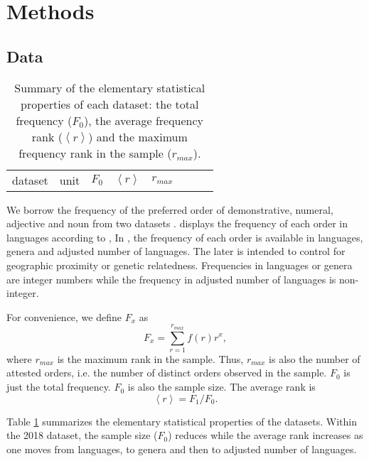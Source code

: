 \documentclass[USenglish]{article}
\begin{document}
\section{Methods}

\subsection{Data}

\label{subsec:data}

\begin{table}[h]
\begin{center}
\begin{tabular}{llllllll}
dataset & unit & $F_0$ & $\left< r \right>$ & $r_{max}$ \\

\end{tabular}
\end{center}
\caption{\label{tbl:elementary_summary}
Summary of the elementary statistical properties of each dataset: the total frequency ($F_0$), the average frequency rank ($\left< r \right>$) and the maximum frequency rank in the sample ($r_{max}$). }
\end{table}

We borrow the frequency of the preferred order of demonstrative, numeral, adjective and noun from two datasets \citep{Dryer2006a, Dryer2018a}. 
\citet[Appendix]{Cysouw2010a} displays the frequency of each order in languages according to \citet{Dryer2006a},
In \citet{Dryer2018a}, the frequency of each order is available in languages, genera and adjusted number of languages. The later is intended to control for geographic proximity or genetic relatedness.  
Frequencies in languages or genera are integer numbers while the frequency in adjusted number of languages is non-integer.
 
For convenience, we define $F_x$ as  
\begin{equation*}
F_x = \sum_{r=1}^{r_{max}}f(r)r^x,
\end{equation*}
where $r_{max}$ is the maximum rank in the sample. Thus, $r_{max}$ is also the number of attested orders, i.e. the number of distinct orders observed in the sample.
$F_0$ is just the total frequency. $F_0$ is also the sample size. 
The average rank is 
\begin{equation*}
\left< r \right> = F_1/F_0.
\end{equation*}

Table \ref{tbl:elementary_summary} summarizes the elementary statistical properties of the datasets. Within the 2018 dataset, the sample size ($F_0$) reduces while the average rank increases as one moves from languages, to genera and then to adjusted number of languages.
\end{document}
